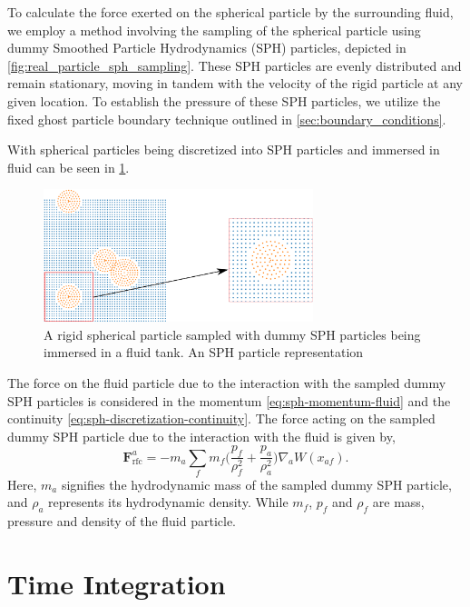 \documentclass[preprint,12pt]{elsarticle}
\newcommand{\ten}[1]{\ensuremath{\mathbf{#1}}}
\begin{document}
To calculate the force exerted on the spherical particle by the surrounding
fluid, we employ a method involving the sampling of the spherical particle
using dummy Smoothed Particle Hydrodynamics (SPH) particles, depicted in
\cref{fig:real_particle_sph_sampling}. These SPH particles are evenly
distributed and remain stationary, moving in tandem with the velocity of the
rigid particle at any given location. To establish the pressure of these SPH
particles, we utilize the fixed ghost particle boundary technique outlined in
\cref{sec:boundary_conditions}.



With spherical particles being discretized into SPH particles and immersed in
fluid can be seen in \cref{fig:many_rb_in_fluid_sph_particles}.
\begin{figure}[!htpb]
  \centering
  \includegraphics[width=0.7\textwidth]{images/rfc_zoomed_combined}
  \caption{A rigid spherical particle sampled with dummy SPH particles being
    immersed in a fluid tank. An SPH particle representation}
  \label{fig:many_rb_in_fluid_sph_particles}
\end{figure}
The force on the fluid particle due to the
interaction with the sampled dummy SPH particles is considered in the momentum
\cref{eq:sph-momentum-fluid} and the continuity
\cref{eq:sph-discretization-continuity}. The force acting on the sampled dummy
SPH particle due to the interaction with the fluid is given by,
\begin{equation}
  \label{eq:rfc-force}
  \ten{F}_{\text{rfc}}^a = -m_a \sum_{f} m_f \bigg(\frac{p_f}{\rho_{f}^2} +
  \frac{p_a}{\rho_{a}^2}\bigg) \nabla_{a} W(x_{af}).
\end{equation}
Here, $m_a$ signifies the hydrodynamic mass of the sampled dummy SPH particle,
and $\rho_a$ represents its hydrodynamic density. While $m_f$, $p_f$ and
$\rho_f$ are mass, pressure and density of the fluid particle.


\FloatBarrier%
\section{Time Integration}
\end{document}
